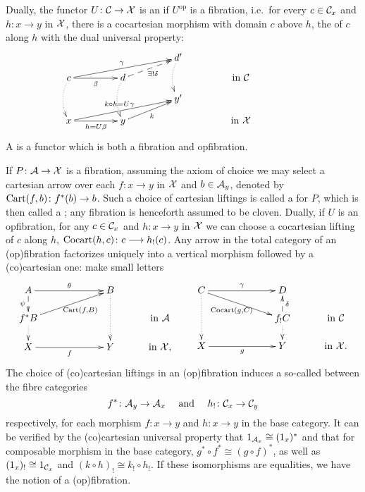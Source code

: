 \documentclass{amsart}
\begin{document}
Dually, the functor $U \colon \mathcal{C} \to \mathcal{X}$ is an  if $U^\mathrm{op}$ is a fibration, i.e.\ for every $c \in \mathcal{C} _x$ and $h \colon x \to y$ in $\mathcal{X}$, there is a cocartesian morphism with domain $c$ above $h$, the  of $c$ along $h$ with the dual universal property:
\begin{displaymath}
\xymatrix @R=.1in @C=.6in
{&& d'\ar @{.>}@/_/[dd] &&\\
c\ar[r]_-{\beta} \ar @{.>}@/_/[dd]
\ar[urr]^-{\gamma} & 
d \ar @{.>}@/_/[dd] \ar @{-->}[ur]_-{\exists! \delta}
&& \textrm{in }\C\\
&& y' &&\\
x\ar[r]_-{h=U\beta} \ar[urr]^-{k\circ h=U\gamma}
 & y \ar[ur]_-k && \textrm{in }\X}
\end{displaymath}
A  is a functor which is both a fibration and opfibration.

If $P\colon \mathcal{A} \to\mathcal{X}$ is a fibration, assuming the axiom of choice we may select a cartesian arrow over each $f\colon x\to y$ in $\mathcal{X}$ and $b\in\mathcal{A} _y$, denoted by $\mathrm{Cart}(f,b)\colon f^*(b)\to b$. Such a choice of cartesian liftings is called a  for $P$, which is then called a ; any fibration is henceforth assumed to be cloven. Dually, if $U$ is an opfibration, for any $c\in\mathcal{C} _x$ and $h \colon x \to y$ in $\mathcal{X}$ we can choose a cocartesian lifting of $c$ along $h$, $\mathrm{Cocart}(h,c)\colon c\longrightarrow h_!(c)$. 
Any arrow in the total category of an (op)fibration factorizes uniquely into
a vertical morphism followed by a (co)cartesian one: {\chris make small letters}
\begin{equation}\label{factor}
\xymatrix @C=.4in @R=.2in
{A\ar[rr]^\theta\ar @{-->}[d]_-{\psi} && B \ar @{.>}[dd] &\\
f^*B\ar[urr]_-{\;\Cart(f,B)} \ar @{.>}[d] &&& \textrm{in }\A  \\
X\ar[rr]_-{f} && Y & \textrm{in }\X,}\qquad
\xymatrix @C=.4in @R=.2in
{C \ar @{.>}[dd]\ar[rr]^\gamma \ar[drr]_-{\Cocart(g,C)} && D &\\
&& f_!C \ar @{-->}[u]_-{\delta} \ar @{.>}[d] & \textrm{in }\C  \\
X\ar[rr]_-{g} && Y & \textrm{in }\X.}
\end{equation}
The choice of (co)cartesian liftings in an (op)fibration induces a so-called  between the fibre categories
\begin{equation}\label{reindexing}
    f^*\colon \mathcal{A} _y\to\mathcal{A} _x\quad\textrm{ and }\quad h_!\colon\mathcal{C} _x\to\mathcal{C} _y
\end{equation}
respectively, for each morphism $f\colon x\to y$ and $h\colon x\to y$ in the base category.
It can be verified by the (co)cartesian universal property that $1_{\mathcal{A} _x}\cong(1_x)^*$ 
and that for composable morphism in the base category, $g^*\circ f^*\cong(g\circ f)^* $, as well as $(1_x)_!\cong1_{\mathcal{C}_x}$ and $(k\circ h)_!\cong k_!\circ h_!$. If these isomorphisms are equalities, we have the notion of a  (op)fibration.
\end{document}
